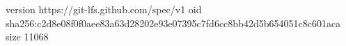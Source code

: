 version https://git-lfs.github.com/spec/v1
oid sha256:c2d8e08f0f0aee83a63d28202e93e07395c7fd6cc8bb42d5b654051c8c601aca
size 11068
